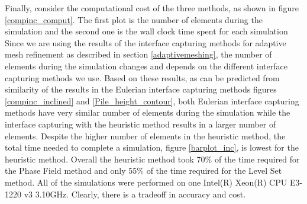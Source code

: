 \documentclass[review]{elsarticle}
\begin{document}
Finally, consider the computational cost of the three methods, as shown in figure \ref{compinc_comput}.
The first plot is the number of elements during the simulation and the second one is the wall clock time spent for each simulation
Since we are using the results of the interface capturing methods for adaptive mesh refinement as described in section \ref{adaptivemeshing}, 
the number of elements during the simulation changes and depends on the different interface capturing methods we use. 
Based on these results, as can be predicted from similarity of the results in the Eulerian interface capturing methods figures \ref{compinc_inclined} 
and \ref{Pile_height_contour}, both Eulerian interface capturing methods have very similar number of elements during the simulation while the 
interface capturing with the heuristic method results in a larger number of elements. 
Despite the higher number of elements in the heuristic method, the total time needed to complete a simulation, figure \ref{barplot_inc},
is lowest for the heuristic method. Overall the heuristic method took 70\% of the time required for the Phase Field method and only 55\% 
of the time required for the Level Set method.
All of the simulations were performed on one Intel(R) Xeon(R) CPU E3-1220 v3 3.10GHz. Clearly, there is a tradeoff in accuracy and cost.

\end{document}
